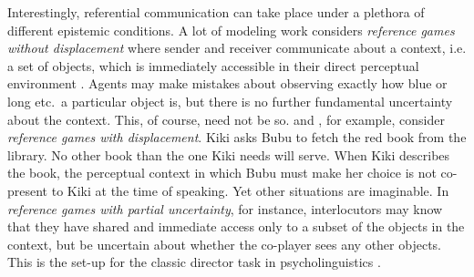 \documentclass[a4paper]{article}
\begin{document}
Interestingly, referential communication can take place under a plethora of different epistemic conditions. 
A lot of modeling work considers \emph{reference games without displacement} where sender and receiver communicate about a context, i.e. a set of objects, which is immediately accessible in their direct perceptual environment \parencite[\emph{e.g.}][]{BaronchelliGong2010:Modeling-the-Em,Franke2012:Scales-Salience,Franke2012:On-Scales-Salie}.
Agents may make mistakes about observing exactly how blue or long etc.~a particular object is, but there is no further fundamental uncertainty about the context. 
This, of course, need not be so. \textcite{lipman_why_2009} and \textcite{Deemter2009:Utility-and-Lan}, for example, consider \emph{reference games with displacement}. 
Kiki asks Bubu to fetch the red book from the library. 
No other book than the one Kiki needs will serve. 
When Kiki describes the book, the perceptual context in which Bubu must make her choice is not co-present to Kiki at the time of speaking. 
Yet other situations are imaginable. 
In \emph{reference games with partial uncertainty}, for instance, interlocutors may know that they have shared and immediate access only to a subset of the objects in the context, but be uncertain about whether the co-player sees any other objects. 
This is the set-up for the classic director task in psycholinguistics \parencite[\emph{e.g.}][]{KraussGlucksberg1977:Social-and-nons,Keysar2000,KeyzarLin2003:Limits-on-Theor}.
\end{document}
